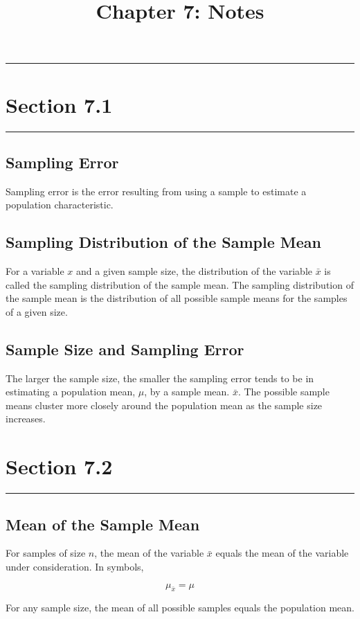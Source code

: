 \documentclass[12pt]{article}
\title{Chapter 7: Notes}
\author{}
\begin{document}
    \maketitle

    \noindent\rule{\textwidth}{0.4pt}
    \section*{Section 7.1}
    \noindent\rule{\textwidth}{0.4pt}
        \subsection*{Sampling Error}    
            Sampling error is the error resulting from using a sample to estimate a population
            characteristic.
        \subsection*{Sampling Distribution of the Sample Mean}
            For a variable $x$ and a given sample size, the distribution of the variable
            $\bar{x}$ is called the sampling distribution of the sample mean. The sampling 
            distribution of the sample mean is the distribution of all possible sample means
            for the samples of a given size.
        \subsection*{Sample Size and Sampling Error}
            The larger the sample size, the smaller the sampling error tends to be in estimating
            a population mean, $\mu$, by a sample mean. $\bar{x}$. The possible sample means
            cluster more closely around the population mean as the sample size increases.

    \section*{Section 7.2}
    \noindent\rule{\textwidth}{0.4pt}
        \subsection*{Mean of the Sample Mean}
            For samples of size $n$, the mean of the variable $\bar{x}$ equals the mean of the
            variable under consideration. In symbols,
            \begin{center}
                \[
                    \mu_{\bar{x}} = \mu    
                \]
            \end{center}
            For any sample size, the mean of all possible samples equals the population mean.
\end{document}
